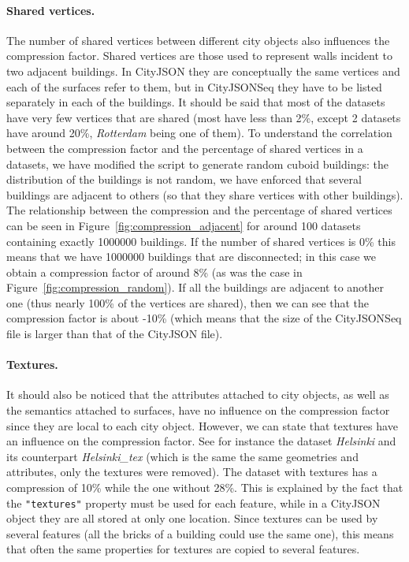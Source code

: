 \documentclass[11pt,halfparskip,parskip=half]{scrartcl}
\begin{document}
\paragraph{Shared vertices.}
The number of shared vertices between different city objects also influences the compression factor.
Shared vertices are those used to represent walls incident to two adjacent buildings.
In CityJSON they are conceptually the same vertices and each of the surfaces refer to them, but in CityJSONSeq they have to be listed separately in each of the buildings.
It should be said that most of the datasets have very few vertices that are shared (most have less than 2\%, except 2 datasets have around 20\%, \emph{Rotterdam} being one of them).
To understand the correlation between the compression factor and the percentage of shared vertices in a datasets, we have modified the script to generate random cuboid buildings: the distribution of the buildings is not random, we have enforced that several buildings are adjacent to others (so that they share vertices with other buildings).
The relationship between the compression and the percentage of shared vertices can be seen in Figure~\ref{fig:compression_adjacent} for around 100 datasets containing exactly \num{1000000} buildings.
If the number of shared vertices is 0\% this means that we have \num{1000000} buildings that are disconnected; in this case we obtain a compression factor of around 8\% (as was the case in Figure~\ref{fig:compression_random}).
If all the buildings are adjacent to another one (thus nearly 100\% of the vertices are shared), then we can see that the compression factor is about -10\% (which means that the size of the CityJSONSeq file is larger than that of the CityJSON file).

%

\paragraph{Textures.}
It should also be noticed that the attributes attached to city objects, as well as the semantics attached to surfaces, have no influence on the compression factor since they are local to each city object.
However, we can state that textures have an influence on the compression factor.
See for instance the dataset \emph{Helsinki} and its counterpart \emph{Helsinki\_tex} (which is the same the same geometries and attributes, only the textures were removed).
The dataset with textures has a compression of 10\% while the one without 28\%.
This is explained by the fact that the \texttt{"textures"} property must be used for each feature, while in a CityJSON object they are all stored at only one location.
Since textures can be used by several features (all the bricks of a building could use the same one), this means that often the same properties for textures are copied to several features.
\end{document}
